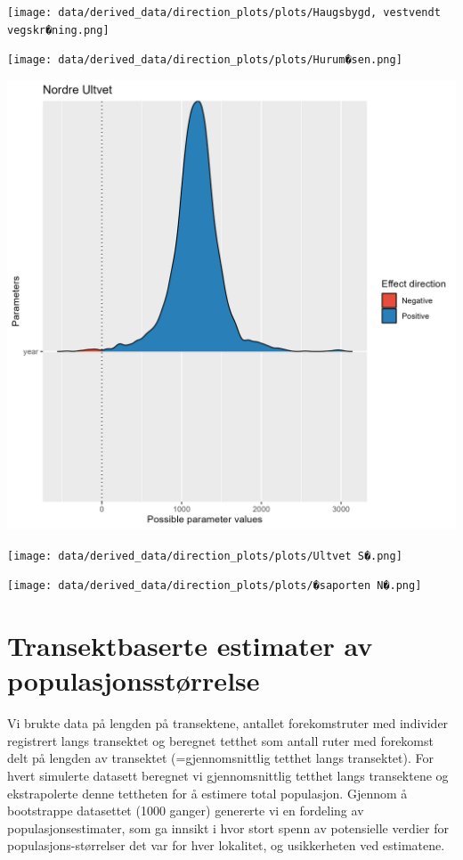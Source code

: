 \documentclass[
  letterpaper,
  DIV=11,
  numbers=noendperiod]{scrreport}
\begin{document}
\texttt{[image: data/derived\_data/direction\_plots/plots/Haugsbygd, vestvendt vegskr�ning.png]}

\texttt{[image: data/derived\_data/direction\_plots/plots/Hurum�sen.png]}

\includegraphics{data/derived_data/direction_plots/plots/Nordre Ultvet.png}

\texttt{[image: data/derived\_data/direction\_plots/plots/Ultvet S�.png]}

\texttt{[image: data/derived\_data/direction\_plots/plots/�saporten N�.png]}


\hypertarget{transektbaserte-estimater-av-populasjonsstuxf8rrelse}{%
\chapter{Transektbaserte estimater av
populasjonsstørrelse}\label{transektbaserte-estimater-av-populasjonsstuxf8rrelse}}

Vi brukte data på lengden på transektene, antallet forekomstruter med
individer registrert langs transektet og beregnet tetthet som antall
ruter med forekomst delt på lengden av transektet (=gjennomsnittlig
tetthet langs transektet). For hvert simulerte datasett beregnet vi
gjennomsnittlig tetthet langs transektene og ekstrapolerte denne
tettheten for å estimere total populasjon. Gjennom å bootstrappe
datasettet (1000 ganger) genererte vi en fordeling av
populasjonsestimater, som ga innsikt i hvor stort spenn av potensielle
verdier for populasjons-størrelser det var for hver lokalitet, og
usikkerheten ved estimatene.
\end{document}
